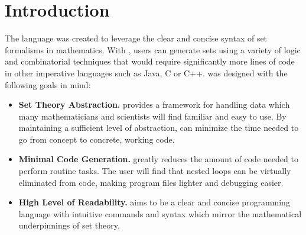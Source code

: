 \chapter{Introduction}
The \lang language was created to leverage the clear and concise syntax of set formalisms in mathematics.  With \lang, users can generate sets using a variety of logic and combinatorial techniques that would require significantly more lines of code in other imperative languages such as Java, C or C++.  \lang was designed with the following goals in mind:
\begin{itemize}
\item\textbf{Set Theory Abstraction. }\lang provides a framework for handling data which many mathematicians and scientists will find familiar and easy to use.  By maintaining a sufficient level of abstraction, \lang can minimize the time needed to go from concept to concrete, working code.  

\item \textbf{Minimal Code Generation. } \lang greatly reduces the amount of code needed to perform routine tasks.  The user will find that nested loops can be virtually eliminated from code, making program files lighter and debugging easier.

\item \textbf{High Level of Readability. } \lang aims to be a clear and concise programming language with intuitive commands and syntax which mirror the mathematical underpinnings of set theory.
\end{itemize}
